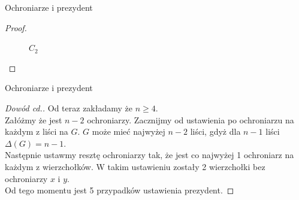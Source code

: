 \documentclass[polish]{beamer}
\begin{document}
\begin{frame}{Ochroniarze i prezydent}
\begin{proof}
\begin{examples}
\begin{figure}
\begin{columns}[t]
                        \caption{$C_2$}
                \end{columns}
            \end{figure}
        \end{examples}
    \end{proof}
\end{frame}

\begin{frame}{Ochroniarze i prezydent}
    \begin{proof}[Dowód cd.]
        \renewcommand{\qedsymbol}{}
        Od teraz zakładamy że $n \ge 4$.\\
        \pause
        Załóżmy że jest $n-2$ ochroniarzy. Zacznijmy od ustawienia po ochroniarzu na każdym z liści na $G$.
        $G$ może mieć najwyżej $n-2$ liści, gdyż dla $n-1$ liści $\Delta\left(G\right)=n-1$.\\
        \pause
        Następnie ustawmy resztę ochroniarzy tak, że jest co najwyżej 1 ochroniarz na każdym z wierzchołków.
        W takim ustawieniu zostały 2 wierzchołki bez ochroniarzy $x$ i $y$. \\
        \pause
        Od tego momentu jest 5 przypadków ustawienia prezydent.
    \end{proof}
\end{frame}
\end{document}
